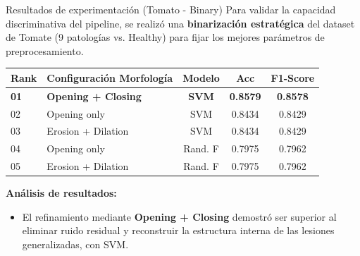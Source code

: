\documentclass[10pt]{beamer}
\begin{document}
\begin{frame}{Resultados de experimentación (Tomato - Binary)}
    Para validar la capacidad discriminativa del pipeline, se realizó una \textbf{binarización estratégica} del dataset de Tomate (9 patologías vs. Healthy) para fijar los mejores parámetros de preprocesamiento.
        
        \begin{table}[]
            \centering
            \begin{tabular}{llccc}
                \toprule
                \textbf{Rank} & \textbf{Configuración Morfología} & \textbf{Modelo} & \textbf{Acc} & \textbf{F1-Score} \\
                \midrule
                \textbf{01} & \textbf{Opening + Closing} & \textbf{SVM} & \textbf{0.8579} & \textbf{0.8578} \\
                02 & Opening only & SVM & 0.8434 & 0.8429 \\
                03 & Erosion + Dilation & SVM & 0.8434 & 0.8429 \\
                04 & Opening only & Rand. F & 0.7975 & 0.7962 \\
                05 & Erosion + Dilation & Rand. F & 0.7975 & 0.7962 \\
                \bottomrule
            \end{tabular}
        \end{table}
        
        \textbf{Análisis de resultados:} 
        \begin{itemize}
            \item El refinamiento mediante \textbf{Opening + Closing} demostró ser superior al eliminar ruido residual y reconstruir la estructura interna de las lesiones generalizadas, con SVM.
        \end{itemize}
\end{frame}
\end{document}
